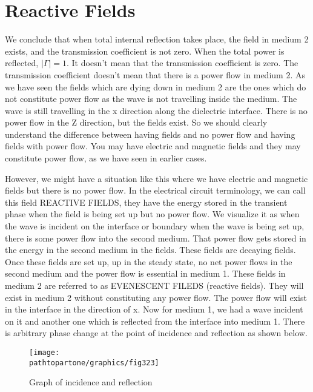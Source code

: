 \section{Reactive Fields}

We conclude that when total internal reflection takes place, the field in medium 2 exists, and the transmission coefficient is not zero. When the total power is reflected, $|\Gamma| = 1$. It doesn't mean that the transmission coefficient is zero. The transmission coefficient doesn't mean that there is a power flow in medium 2. As we have seen the fields which are dying down in medium 2 are the ones which do not constitute power flow as the wave is not travelling inside the medium. The wave is still travelling in the x direction along the dielectric interface. There is no power flow in the Z direction, but the fields exist. So we should clearly understand the difference between having fields and no power flow and having fields with power flow. You may have electric and magnetic fields and they may constitute power flow, as we have seen in earlier cases.

However, we might have a situation like this where we have electric and magnetic fields but there is no power flow. In the electrical circuit terminology, we can call this field REACTIVE FIELDS, they have the energy stored in the transient phase when the field is being set up but no power flow. We visualize it as when the wave is incident on the interface or boundary when the wave is being set up, there is some power flow into the second medium. That power flow gets stored in the energy in the second medium in the fields. These fields are decaying fields. Once these fields are set up, up in the steady state, no net power flows in the second medium and the power flow is essential in medium 1. These fields in medium 2 are referred to as EVENESCENT FILEDS (reactive fields). They will exist in medium 2 without constituting any power flow. The power flow will exist in the interface in the direction of x. Now for medium 1, we had a wave incident on it and another one which is reflected from the interface into medium 1. There is arbitrary phase change at the point of incidence and reflection as shown below.
\begin{figure}[h]
\centering
\texttt{[image: \\pathtopartone/graphics/fig323]}
\caption{Graph of incidence and reflection}
\end{figure}

